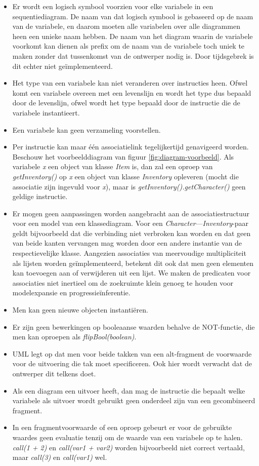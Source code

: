 \begin{itemize}
	\item Er wordt een logisch symbool voorzien voor elke variabele in een sequentiediagram. De naam van dat logisch symbool is gebaseerd op de naam van de variabele, en daarom moeten alle variabelen over alle diagrammen heen een unieke naam hebben. De naam van het diagram waarin de variabele voorkomt kan dienen als prefix om de naam van de variabele toch uniek te maken zonder dat tussenkomst van de ontwerper nodig is. Door tijdsgebrek is dit echter niet ge\"implementeerd.
	\item Het type van een variabele kan niet veranderen over instructies heen. Ofwel komt een variabele overeen met een levenslijn en wordt het type dus bepaald door de levenslijn, ofwel wordt het type bepaald door de instructie die de variabele instantieert.
	\item Een variabele kan geen verzameling voorstellen.
	\item Per instructie kan maar \'e\'en associatielink tegelijkertijd genavigeerd worden. Beschouw het voorbeelddiagram van figuur \ref{fig:diagram-voorbeeld}. Als variabele \textit{x} een object van klasse \textit{Item} is, dan zal een oproep van \textit{getInventory()} op \textit{x} een object van klasse \textit{Inventory} opleveren (mocht die associatie zijn ingevuld voor \textit{x}), maar is \textit{getInventory().getCharacter()} geen geldige instructie.
	\item Er mogen geen aanpassingen worden aangebracht aan de associatiestructuur voor een model van een klassediagram. Voor een \textit{Character}---\textit{Inventory}-paar geldt bijvoorbeeld dat die verbinding niet verbroken kan worden en dat geen van beide kanten vervangen mag worden door een andere instantie van de respectievelijke klasse. Aangezien associaties van meervoudige multipliciteit als lijsten worden ge\"implementeerd, betekent dit ook dat men geen elementen kan toevoegen aan of verwijderen uit een lijst. We maken de predicaten voor associaties niet inertieel om de zoekruimte klein genoeg te houden voor modelexpansie en progressie\"inferentie.
	\item Men kan geen nieuwe objecten instanti\"eren.
	\item Er zijn geen bewerkingen op booleaanse waarden behalve de NOT-functie, die men kan oproepen als \textit{flipBool(boolean)}.
	\item UML legt op dat men voor beide takken van een alt-fragment de voorwaarde voor de uitvoering die tak moet specificeren. Ook hier wordt verwacht dat de ontwerper dit telkens doet.
	\item Als een diagram een uitvoer heeft, dan mag de instructie die bepaalt welke variabele als uitvoer wordt gebruikt geen onderdeel zijn van een gecombineerd fragment.
	\item In een fragmentvoorwaarde of een oproep gebeurt er voor de gebruikte waardes geen evaluatie tenzij om de waarde van een variabele op te halen. \textit{call(1 + 2)} en \textit{call(var1 + var2)} worden bijvoorbeeld niet correct vertaald, maar \textit{call(3)} en \textit{call(var1)} wel.
\end{itemize}

